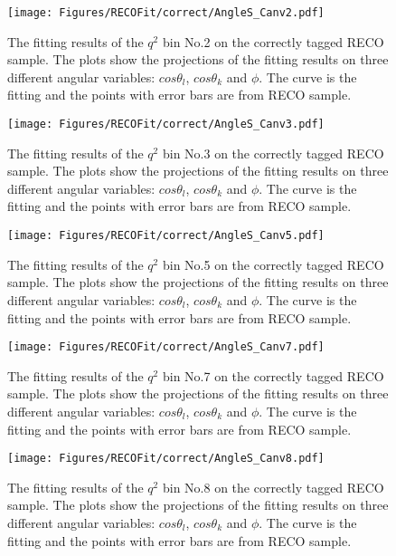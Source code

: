 \begin{figure}[!hbt]
  \centering
  \texttt{[image: Figures/RECOFit/correct/AngleS\_Canv2.pdf]}
  \caption{The fitting results of the $q^2$ bin No.2 on the correctly
    tagged RECO  sample. The plots show the projections of the fitting results on
    three different angular variables: $cos\theta_l$, $cos\theta_k$
    and $\phi$. The curve is the fitting and the points with error
    bars are from RECO sample. } 
  \label{fig:rtag-bin2}
\end{figure}

\begin{figure}[!hbt]
  \centering
  \texttt{[image: Figures/RECOFit/correct/AngleS\_Canv3.pdf]}
  \caption{The fitting results of the $q^2$ bin No.3 on the correctly
    tagged RECO  sample. The plots show the projections of the fitting results on
    three different angular variables: $cos\theta_l$, $cos\theta_k$
    and $\phi$. The curve is the fitting and the points with error
    bars are from RECO sample. } 
  \label{fig:rtag-bin3}
\end{figure}

\begin{figure}[!hbt]
  \centering
  \texttt{[image: Figures/RECOFit/correct/AngleS\_Canv5.pdf]}
  \caption{The fitting results of the $q^2$ bin No.5 on the correctly
    tagged RECO  sample. The plots show the projections of the fitting results on
    three different angular variables: $cos\theta_l$, $cos\theta_k$
    and $\phi$. The curve is the fitting and the points with error
    bars are from RECO sample. } 
  \label{fig:rtag-bin5}
\end{figure}

\begin{figure}[!hbt]
  \centering
  \texttt{[image: Figures/RECOFit/correct/AngleS\_Canv7.pdf]}
  \caption{The fitting results of the $q^2$ bin No.7 on the correctly
    tagged RECO  sample. The plots show the projections of the fitting results on
    three different angular variables: $cos\theta_l$, $cos\theta_k$
    and $\phi$. The curve is the fitting and the points with error
    bars are from RECO sample. } 
  \label{fig:rtag-bin7}
\end{figure}

\begin{figure}[!hbt]
  \centering
  \texttt{[image: Figures/RECOFit/correct/AngleS\_Canv8.pdf]}
  \caption{The fitting results of the $q^2$ bin No.8 on the correctly
    tagged RECO  sample. The plots show the projections of the fitting results on
    three different angular variables: $cos\theta_l$, $cos\theta_k$
    and $\phi$. The curve is the fitting and the points with error
    bars are from RECO sample. } 
  \label{fig:rtag-bin8}
\end{figure}

